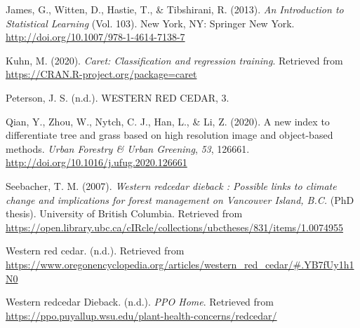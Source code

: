 \documentclass[12pt,twoside]{reedthesis}
\begin{document}
\leavevmode\hypertarget{ref-james_introduction_2013}{}%
James, G., Witten, D., Hastie, T., \& Tibshirani, R. (2013). \emph{An Introduction to Statistical Learning} (Vol. 103). New York, NY: Springer New York. \url{http://doi.org/10.1007/978-1-4614-7138-7}

\leavevmode\hypertarget{ref-caret}{}%
Kuhn, M. (2020). \emph{Caret: Classification and regression training}. Retrieved from \url{https://CRAN.R-project.org/package=caret}

\leavevmode\hypertarget{ref-peterson_western_nodate}{}%
Peterson, J. S. (n.d.). WESTERN RED CEDAR, 3.

\leavevmode\hypertarget{ref-qian_new_2020}{}%
Qian, Y., Zhou, W., Nytch, C. J., Han, L., \& Li, Z. (2020). A new index to differentiate tree and grass based on high resolution image and object-based methods. \emph{Urban Forestry \& Urban Greening}, \emph{53}, 126661. \url{http://doi.org/10.1016/j.ufug.2020.126661}

\leavevmode\hypertarget{ref-seebacher_western_2007}{}%
Seebacher, T. M. (2007). \emph{Western redcedar dieback : Possible links to climate change and implications for forest management on Vancouver Island, B.C.} (PhD thesis). University of British Columbia. Retrieved from \url{https://open.library.ubc.ca/cIRcle/collections/ubctheses/831/items/1.0074955}

\leavevmode\hypertarget{ref-noauthor_western_nodate-1}{}%
Western red cedar. (n.d.). Retrieved from \url{https://www.oregonencyclopedia.org/articles/western_red_cedar/\#.YB7fUy1h1N0}

\leavevmode\hypertarget{ref-noauthor_western_nodate}{}%
Western redcedar Dieback. (n.d.). \emph{PPO Home}. Retrieved from \url{https://ppo.puyallup.wsu.edu/plant-health-concerns/redcedar/}


\end{document}
